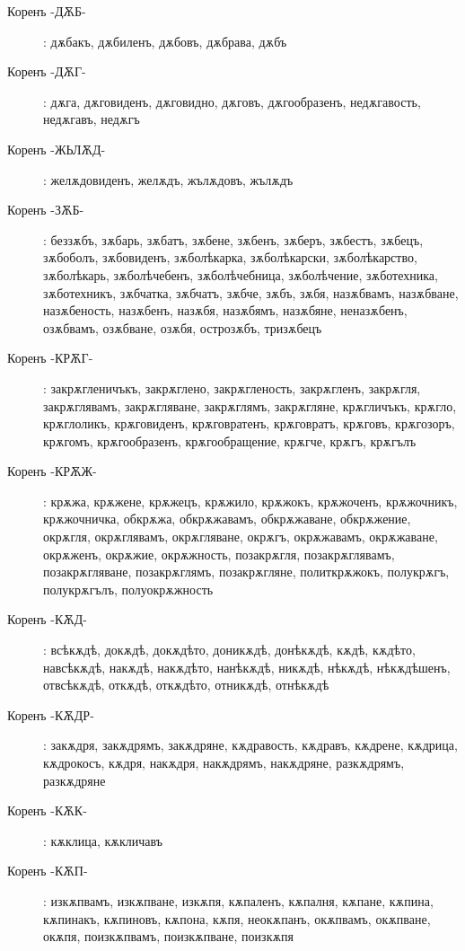 \documentclass{article}
\begin{document}
\begin{description}
		\item[Коренъ -ДѪБ-]: дѫбакъ, дѫбиленъ, дѫбовъ, дѫбрава, дѫбъ
		
		\item[Коренъ -ДѪГ-]: дѫга, дѫговиденъ, дѫговидно, дѫговъ, дѫгообразенъ, недѫгавость, недѫгавъ, недѫгъ
		
		\item[Коренъ -ЖЬЛѪД-]: желѫдовиденъ, желѫдъ, жълѫдовъ, жълѫдъ
		
		\item[Коренъ -ЗѪБ-]: беззѫбъ, зѫбарь, зѫбатъ, зѫбене, зѫбенъ, зѫберъ, зѫбестъ, зѫбецъ, зѫбоболъ, зѫбовиденъ, зѫболѣкарка, зѫболѣкарски, зѫболѣкарство, зѫболѣкарь, зѫболѣчебенъ, зѫболѣчебница, зѫболѣчение, зѫботехника, зѫботехникъ, зѫбчатка, зѫбчатъ, зѫбче, зѫбъ, зѫбя, назѫбвамъ, назѫбване, назѫбеность, назѫбенъ, назѫбя, назѫбямъ, назѫбяне, неназѫбенъ, озѫбвамъ, озѫбване, озѫбя, острозѫбъ, тризѫбецъ
		
		\item[Коренъ -КРѪГ- ]: закрѫгленичъкъ, закрѫглено, закрѫгленость, закрѫгленъ, закрѫгля, закрѫглявамъ, закрѫгляване, закрѫглямъ, закрѫгляне, крѫгличъкъ, крѫгло, крѫглоликъ, крѫговиденъ, крѫговратенъ, крѫговратъ, крѫговъ, крѫгозоръ, крѫгомъ, крѫгообразенъ, крѫгообращение, крѫгче, крѫгъ, крѫгълъ
		
			\item[Коренъ  -КРѪЖ-]:
		крѫжа, крѫжене, крѫжецъ, крѫжило, крѫжокъ, крѫжоченъ, крѫжочникъ, крѫжочничка, обкрѫжа, обкрѫжавамъ, обкрѫжаване, обкрѫжение, окрѫгля, окрѫглявамъ, окрѫгляване, окрѫгъ, окрѫжавамъ, окрѫжаване, окрѫженъ, окрѫжие, окрѫжность, позакрѫгля, позакрѫглявамъ, позакрѫгляване, позакрѫглямъ, позакрѫгляне, политкрѫжокъ, полукрѫгъ, полукрѫгълъ, полуокрѫжность
		
		\item[Коренъ -КѪД-]: всѣкѫдѣ, докѫдѣ, докѫдѣто, доникѫдѣ, донѣкѫдѣ, кѫдѣ, кѫдѣто, навсѣкѫдѣ, накѫдѣ, накѫдѣто, нанѣкѫдѣ, никѫдѣ, нѣкѫдѣ, нѣкѫдѣшенъ, отвсѣкѫдѣ, откѫдѣ, откѫдѣто, отникѫдѣ, отнѣкѫдѣ
		
		\item[Коренъ -КѪДР-]: закѫдря, закѫдрямъ, закѫдряне, кѫдравость, кѫдравъ, кѫдрене, кѫдрица, кѫдрокосъ, кѫдря, накѫдря, накѫдрямъ, накѫдряне, разкѫдрямъ, разкѫдряне
		\item[Коренъ -КѪК-]: кѫклица, кѫкличавъ
		
		\item[Коренъ -КѪП-]: изкѫпвамъ, изкѫпване, изкѫпя, кѫпаленъ, кѫпалня, кѫпане, кѫпина, кѫпинакъ, кѫпиновъ, кѫпона, кѫпя, неокѫпанъ, окѫпвамъ, окѫпване, окѫпя, поизкѫпвамъ, поизкѫпване, поизкѫпя
		

\end{description}
\end{document}
